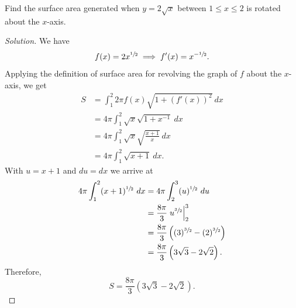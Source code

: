 \documentclass[compacto,10pt,comentarios]{aleph-notas}
\begin{document}
\begin{ejer}
    Find the surface area generated when $y = 2\sqrt{x}$ between $1 \leq x \leq 2$ is rotated about the $x$-axis.
\end{ejer}
\begin{proof}[Solution]
    We have
    $$
        f(x) = 2 x ^{\sfrac{1}{2}} \implies f'(x) = x ^ {-\sfrac{1}{2}}.
    $$
    Applying the definition of surface area for revolving the graph of $f$ about the $x$-axis, we get
    \begin{align*}
        S & = \int_{1}^{2} 2 \pi f(x) \sqrt{1 + (f'(x)) ^ {2}} ~ dx \\
        & = 4 \pi \int_{1}^{2} \sqrt{x} \sqrt{1 + x^{-1}} ~ dx \\
        & = 4 \pi \int_{1}^{2} \sqrt{x} \sqrt{\frac{x + 1}{x}} ~ dx \\
        & = 4 \pi \int_{1}^{2} \sqrt{x + 1} ~ dx .
    \end{align*}
    With $u = x + 1$ and $du = dx$ we arrive at
    \begin{align*}
        4 \pi \int_{1}^{2} (x + 1)^{\sfrac{1}{2}} ~ dx & =  4 \pi \int_{2}^{3} (u)^{\sfrac{1}{2}} ~ du \\
        & = \frac{8\pi}{3} \left. u ^{\sfrac{3}{2}} \right\rvert_{2}^{3} \\
        & = \frac{8\pi}{3} \left( (3)^{\sfrac{3}{2}} - (2)^{\sfrac{3}{2}} \right) \\ 
        & = \frac{8\pi}{3} \left( 3 \sqrt{3} - 2 \sqrt{2} \right).
    \end{align*}
    Therefore,
    $$
    S = \frac{8\pi}{3} \left( 3 \sqrt{3} - 2 \sqrt{2} \right).
    $$
\end{proof}
\end{document}
